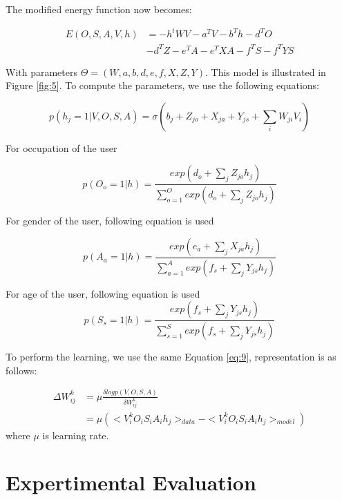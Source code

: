 \documentclass[conference]{IEEEtran}
\begin{document}
    The modified energy function now becomes:

    \begin{align}
      E(O,S,A,V,h) &= -h^tWV-a^TV-b^Th-d^TO \nonumber \\
      &-d^TZ-e^TA-e^TXA-f^TS-f^TYS
      \label{eq:17}
    \end{align}

    With parameters $\Theta = (W,a,b,d,e,f,X,Z,Y)$. This model is illustrated in Figure \ref{fig:5}. To compute the parameters, we use the following equations:

    \begin{equation}
      p(h_j=1|V,O,S,A) = \sigma(b_j+Z_{jo}+X_{ja}+Y_{js}+\sum_{i}W_{ji}V_{i})
      \label{eq:18}
    \end{equation}

    For occupation of the user

    \begin{equation}
      p(O_o=1|h) = \frac{exp(d_o+\sum_jZ_{jo}h_j)}{\sum_{o=1}^Oexp(d_o+\sum_{j}Z_{jo}h_j)}
      \label{eq:19}
    \end{equation}

    For gender of the user, following equation is used

    \begin{equation}
      p(A_a=1|h) = \frac{exp(e_a+\sum_jX_{ja}h_j)}{\sum_{a=1}^Aexp(f_s+\sum_jY_{js}h_j)}
      \label{eq:20}
    \end{equation}

    For age of the user, following equation is used
    \begin{equation}
      p(S_s=1|h)=\frac{exp(f_s+\sum_jY_{js}h_j)}{\sum_{s=1}^Sexp(f_s+\sum_jY_{js}h_j)}
      \label{eq:21}
    \end{equation}

    To perform the learning, we use the same Equation \ref{eq:9}, representation is as follows:

    \begin{align}
      \Delta W_{ij}^k & = \mu \frac{\delta logp(V,O,S,A)}{\delta W_{ij}^k} \nonumber \\
                      & = \mu (<V_i^kO_iS_iA_ih_j>_{data} - <V_i^kO_iS_iA_ih_j>_{model})
                      \label{eq:22}
    \end{align}
    where $\mu$ is learning rate.

\section{Expertimental Evaluation} 
\end{document}

